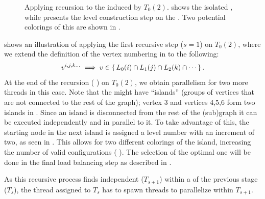 \begin{figure}[t]
	     \hspace{1.75em}
     	\caption{Applying recursion to the \subgraph induced by
          $T_0(2)$.  shows the isolated \subgraph,
          while  presents the level construction step on the
          \subgraph. Two potential \DONE colorings of this \subgraph are shown
          in .}
     	
     	\label{fig:rec_d1_s2}
     \end{figure}
     
      shows an illustration of applying the first recursive step ($s=1$) on $T_0(2)$, where we extend the definition of the vertex numbering in  to the following:
	 \begin{equation}
	    v^{i,j,k...} \implies v \in \set{L_0(i) \cap L_1(j) \cap L_2(k) \cap \cdots}.
	 \end{equation}
At the end of the recursion (\cf
{}) on $T_0(2)$, we obtain parallelism for
two more threads in this case.
Note that the \subgraphs might have ``islands'' (groups of vertices
that are not connected to the rest of the graph); \eg vertex 3 and vertices
4,5,6 form two islands in . Since an island is 
disconnected from the rest of the (sub)graph it can be executed independently
and in parallel to it. To take advantage of this, the starting node in the
next island is assigned a level number with an increment of two, as seen in
. This allows for two different colorings of the island,
increasing the
number of valid \DONE configurations (\cf
{}). The selection of the optimal
one will be done in the final load balancing step as described in
.
     
As this recursive process finds independent \levelGroups
($T_{s+1}$) within a \levelGroup of the previous stage ($T_s$), the
thread assigned to $T_s$ has to spawn threads to parallelize within
$T_{s+1}$.

